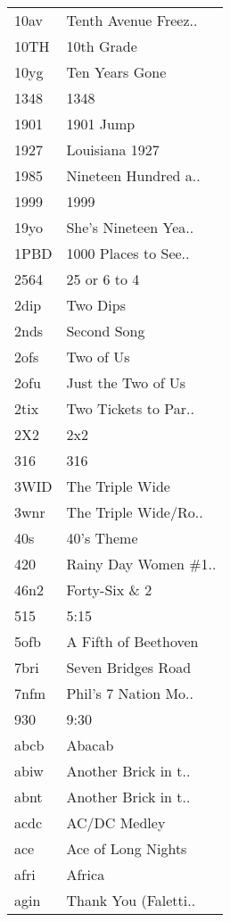 \begin{supertabular}{ll}
 10av &  Tenth Avenue Freez.. \\
 10TH &            10th Grade \\
 10yg &        Ten Years Gone \\
 1348 &                  1348 \\
 1901 &             1901 Jump \\
 1927 &        Louisiana 1927 \\
 1985 &  Nineteen Hundred a.. \\
 1999 &                  1999 \\
 19yo &  She's Nineteen Yea.. \\
 1PBD &  1000 Places to See.. \\
 2564 &          25 or 6 to 4 \\
 2dip &              Two Dips \\
 2nds &           Second Song \\
 2ofs &             Two of Us \\
 2ofu &    Just the Two of Us \\
 2tix &  Two Tickets to Par.. \\
  2X2 &                   2x2 \\
  316 &                   316 \\
 3WID &       The Triple Wide \\
 3wnr &  The Triple Wide/Ro.. \\
  40s &            40's Theme \\
  420 &  Rainy Day Women \#1.. \\
 46n2 &         Forty-Six \& 2 \\
  515 &                  5:15 \\
 5ofb &  A Fifth of Beethoven \\
 7bri &    Seven Bridges Road \\
 7nfm &  Phil's 7 Nation Mo.. \\
  930 &                  9:30 \\
 abcb &                Abacab \\
 abiw &  Another Brick in t.. \\
 abnt &  Another Brick in t.. \\
 acdc &          AC/DC Medley \\
  ace &    Ace of Long Nights \\
 afri &                Africa \\
 agin &  Thank You (Faletti.. \\

\end{supertabular}
